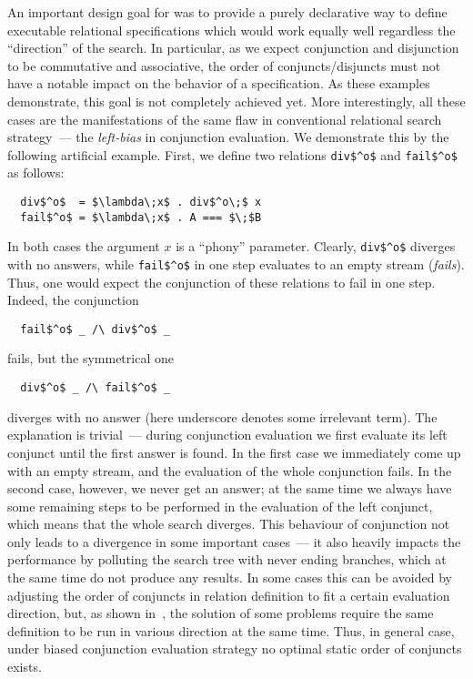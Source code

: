 An important design goal for \mk was to provide a purely declarative way to define executable relational specifications which would work equally well regardless the ``direction'' of the search.
In particular, as we expect conjunction and disjunction to be commutative and associative, the order of conjuncts/disjuncts must not have a notable impact on the behavior of
a specification. As these examples demonstrate, this goal is not completely achieved yet. More interestingly, all these cases are the manifestations of the same flaw in conventional
relational search strategy~--- the \emph{left-bias} in conjunction evaluation. We demonstrate this by the following artificial example. First, we define two relations \lstinline|div$^o$| and
\lstinline|fail$^o$| as follows:

\begin{lstlisting}
  div$^o$  = $\lambda\;x$ . div$^o\;$ x
  fail$^o$ = $\lambda\;x$ . A === $\;$B
\end{lstlisting}

In both cases the argument $x$ is a ``phony'' parameter. Clearly, \lstinline|div$^o$| diverges with no answers, while \lstinline|fail$^o$| in one step evaluates to an empty stream (\emph{fails}). Thus,
one would expect the conjunction of these relations to fail in one step. Indeed, the conjunction

\begin{lstlisting}
  fail$^o$ _ /\ div$^o$ _
\end{lstlisting}

fails, but the symmetrical one

\begin{lstlisting}
  div$^o$ _ /\ fail$^o$ _ 
\end{lstlisting}

diverges with no answer (here underscore denotes some irrelevant term). The explanation is trivial~--- during conjunction evaluation we first evaluate its left conjunct
until the first answer is found. In the first case we immediately come up with an empty stream, and the evaluation of the whole conjunction fails. In the second case,
however, we never get an answer; at the same time we always have some remaining steps to be performed in the evaluation of the left conjunct, which means that the
whole search diverges. This behaviour of conjunction not only leads to a divergence in some important cases~--- it also heavily impacts the performance by polluting
the search tree with never ending branches, which at the same time do not produce any results. In some cases this can be avoided by adjusting the order of conjuncts in
relation definition to fit a certain evaluation direction, but, as shown in~\cite{fair:semantics}, the solution of some problems require the same definition to be run in
various direction at the same time. Thus, in general case, under biased conjunction evaluation strategy no optimal static order of conjuncts exists.


